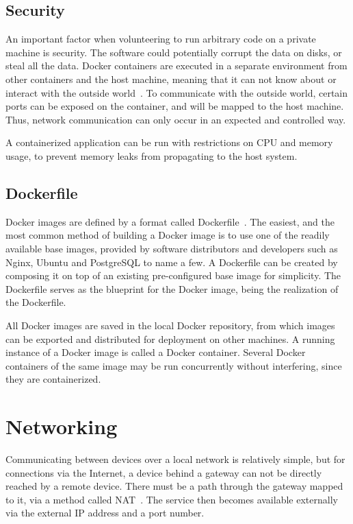 \subsection{Security}
An important factor when volunteering to run arbitrary code on a private machine is security. The software could potentially corrupt the data on disks, or steal all the data. 
Docker containers are executed in a separate environment from other containers and the host machine, meaning that it can not know about or interact with the outside world~\cite{docker-security}. To communicate with the outside world, certain ports can be exposed on the container, and will be mapped to the host machine. Thus, network communication can only occur in an expected and controlled way. 

A containerized application can be run with restrictions on CPU and memory usage, to prevent memory leaks from propagating to the host system.

\subsection{Dockerfile}
Docker images are defined by a format called Dockerfile~\cite{docker-dockerfile}. The easiest, and the most common method of building a Docker image is to use one of the readily available base images, provided by software distributors and developers such as Nginx, Ubuntu and PostgreSQL to name a few. A Dockerfile can be created by composing it on top of an existing pre-configured base image for simplicity. The Dockerfile serves as the blueprint for the Docker image, being the realization of the Dockerfile.

All Docker images are saved in the local Docker repository, from which images can be exported and distributed for deployment on other machines. A running instance of a Docker image is called a Docker container. Several Docker containers of the same image may be run concurrently without interfering, since they are containerized.

\section{Networking}
Communicating between devices over a local network is relatively simple, but for connections via the Internet, a device behind a gateway can not be directly reached by a remote device. There must be a path through the gateway mapped to it, via a method called NAT~\cite{kurose:p349}. The service then becomes available externally via the external IP address and a port number. 

